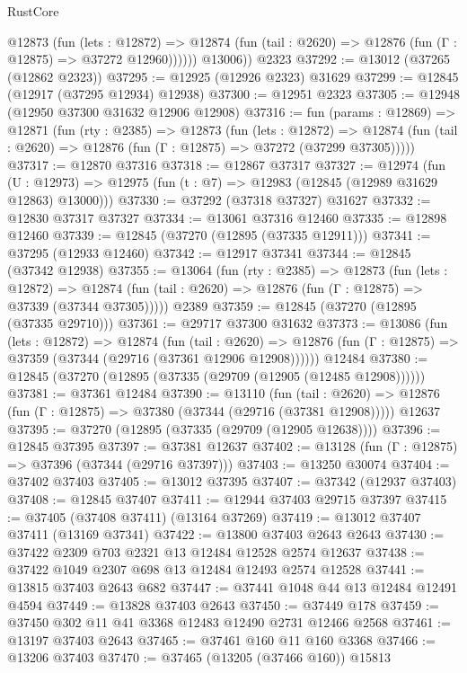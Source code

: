 \begin{lexlean}{RustCore}
\begin{coremodule}
            @12873
              (fun (lets : @12872) =>
              @12874 (fun (tail : @2620) => @12876 (fun (Γ : @12875) => @37272 @12960))))))
        @13006))
    @2323
@37292 := @13012 (@37265 (@12862 @2323))
@37295 := @12925 (@12926 @2323) @31629
@37299 := @12845 (@12917 (@37295 @12934) @12938)
@37300 := @12951 @2323
@37305 := @12948 (@12950 @37300 @31632 @12906 @12908)
@37316 := fun (params : @12869) =>
  @12871
    (fun (rty : @2385) =>
    @12873
      (fun (lets : @12872) =>
      @12874 (fun (tail : @2620) => @12876 (fun (Γ : @12875) => @37272 (@37299 @37305)))))
@37317 := @12870 @37316
@37318 := @12867 @37317
@37327 := @12974
    (fun (U : @12973) => @12975 (fun (t : @7) => @12983 (@12845 (@12989 @31629 @12863) @13000)))
@37330 := @37292 (@37318 @37327) @31627
@37332 := @12830 @37317 @37327
@37334 := @13061 @37316 @12460
@37335 := @12898 @12460
@37339 := @12845 (@37270 (@12895 (@37335 @12911)))
@37341 := @37295 (@12933 @12460)
@37342 := @12917 @37341
@37344 := @12845 (@37342 @12938)
@37355 := @13064
    (fun (rty : @2385) =>
    @12873
      (fun (lets : @12872) =>
      @12874 (fun (tail : @2620) => @12876 (fun (Γ : @12875) => @37339 (@37344 @37305)))))
    @2389
@37359 := @12845 (@37270 (@12895 (@37335 @29710)))
@37361 := @29717 @37300 @31632
@37373 := @13086
    (fun (lets : @12872) =>
    @12874
      (fun (tail : @2620) =>
      @12876 (fun (Γ : @12875) => @37359 (@37344 (@29716 (@37361 @12906 @12908))))))
    @12484
@37380 := @12845 (@37270 (@12895 (@37335 (@29709 (@12905 (@12485 @12908))))))
@37381 := @37361 @12484
@37390 := @13110
    (fun (tail : @2620) => @12876 (fun (Γ : @12875) => @37380 (@37344 (@29716 (@37381 @12908)))))
    @12637
@37395 := @37270 (@12895 (@37335 (@29709 (@12905 @12638))))
@37396 := @12845 @37395
@37397 := @37381 @12637
@37402 := @13128 (fun (Γ : @12875) => @37396 (@37344 (@29716 @37397)))
@37403 := @13250 @30074
@37404 := @37402 @37403
@37405 := @13012 @37395
@37407 := @37342 (@12937 @37403)
@37408 := @12845 @37407
@37411 := @12944 @37403 @29715 @37397
@37415 := @37405 (@37408 @37411) (@13164 @37269)
@37419 := @13012 @37407 @37411 (@13169 @37341)
@37422 := @13800 @37403 @2643 @2643
@37430 := @37422 @2309 @703 @2321 @13 @12484 @12528 @2574 @12637
@37438 := @37422 @1049 @2307 @698 @13 @12484 @12493 @2574 @12528
@37441 := @13815 @37403 @2643 @682
@37447 := @37441 @1048 @44 @13 @12484 @12491 @4594
@37449 := @13828 @37403 @2643
@37450 := @37449 @178
@37459 := @37450 @302 @11 @41 @3368 @12483 @12490 @2731 @12466 @2568
@37461 := @13197 @37403 @2643
@37465 := @37461 @160 @11 @160 @3368
@37466 := @13206 @37403
@37470 := @37465 (@13205 (@37466 @160)) @15813

\end{coremodule}
\end{lexlean}
